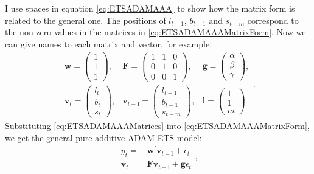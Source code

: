 \documentclass[]{book}
\theoremstyle{definition}
\theoremstyle{definition}
\theoremstyle{definition}
\theoremstyle{definition}
\theoremstyle{remark}
\begin{document}
I use spaces in equation \eqref{eq:ETSADAMAAA} to show how the matrix form is related to the general one. The positions of \(l_{t-1}\), \(b_{t-1}\) and \(s_{t-m}\) correspond to the non-zero values in the matrices in \eqref{eq:ETSADAMAAAMatrixForm}. Now we can give names to each matrix and vector, for example:
\begin{equation}
  \begin{aligned}
    \mathbf{w} = \begin{pmatrix} 1 \\ 1 \\ 1 \end{pmatrix}, & \mathbf{F} = \begin{pmatrix} 1 & 1 & 0 \\ 0 & 1 & 0 \\ 0 & 0 & 1 \end{pmatrix}, & \mathbf{g} = \begin{pmatrix} \alpha \\ \beta \\ \gamma \end{pmatrix}, \\
    \mathbf{v}_{t} = \begin{pmatrix} l_t \\ b_t \\ s_t \end{pmatrix}, & \mathbf{v}_{t-\mathbf{l}} = \begin{pmatrix} l_{t-1} \\ b_{t-1} \\ s_{t-m} \end{pmatrix}, & \mathbf{l} = \begin{pmatrix} 1 \\ 1 \\ m \end{pmatrix}
  \end{aligned}.
  \label{eq:ETSADAMAAAMatrices}
\end{equation}
Substituting \eqref{eq:ETSADAMAAAMatrices} into \eqref{eq:ETSADAMAAAMatrixForm}, we get the general pure additive ADAM ETS model:
\begin{equation}
  \begin{aligned}
    {y}_{t} = &\mathbf{w}^\prime \mathbf{v}_{t-\mathbf{l}} + \epsilon_t \\
    \mathbf{v}_{t} = &\mathbf{F} \mathbf{v}_{t-\mathbf{l}} + \mathbf{g} \epsilon_t
  \end{aligned},
  \label{eq:ETSADAMStateSpacePureAdditive}
\end{equation}
\end{document}
